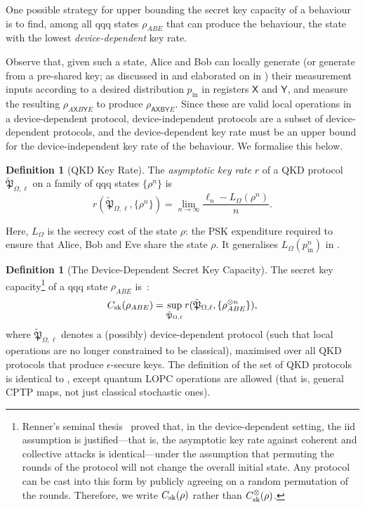 \documentclass[10pt, a4paper]{article}
\numberwithin{equation}{section} %
\newcounter{stmt} %
\theoremstyle{definition}
\newtheorem{defn}[stmt]{Definition}
\theoremstyle{plain}
\newcommand{\?}{\mathrel{?}} %
\newcommand{\crv}[1]{\mathsf{#1}}
\newcommand{\qproto}[2][\ell]{\tilde{\mathfrak{P}}_{#2, #1}}
\newcommand{\prin}[1][p]{#1_{\mathrm{in}}}
\newcommand{\sk}{\rm sk}
\begin{document}
    One possible strategy for upper bounding the secret key capacity of a behaviour is to find, among all qqq states \(\rho_{ABE}\) that can produce the behaviour, the state with the lowest \emph{device-dependent} key rate.

    Observe that, given such a state, Alice and Bob can locally generate (or generate from a pre-shared key; as discussed in  and elaborated on in ) their measurement inputs according to a desired distribution \(\prin\) in registers \(\crv{X}\) and \(\crv{Y}\), and measure the resulting \(\rho_{A\crv{X}B\crv{Y}E}\) to produce \(\rho_{\crv{AXBY}E}\). Since these are valid local operations in a device-dependent protocol, device-independent protocols are a subset of device-dependent protocols, and the device-dependent key rate must be an upper bound for the device-independent key rate of the behaviour. We formalise this below.

    \begin{defn}[QKD Key Rate]
      The \emph{asymptotic key rate} \(r\) of a QKD protocol \(\qproto{\Omega}\) on a family of qqq states \({\{\rho^{n}\}}\) is
      \begin{equation}
        r(\qproto{\Omega}, \{\rho^n\}) = \lim_{n\to\infty} \frac{\ell_n - L_{\Omega}(\rho^n)}{n}.
      \end{equation}
    \end{defn}
    Here, \(L_{\Omega}\) is the secrecy cost of the state \(\rho\): the PSK expenditure required to ensure that Alice, Bob and Eve share the state \(\rho\). It generalises \(L_{\Omega}(\prin^n)\) in .

    \begin{defn}[The Device-Dependent Secret Key Capacity]\label{def:seckeycapstate}
      The secret key capacity\footnote{Renner's seminal thesis~\cite{RennerQKD} proved that, in the device-dependent setting, the iid assumption is justified---that is, the asymptotic key rate against coherent and collective attacks is identical---under the assumption that permuting the rounds of the protocol will not change the overall initial state. Any protocol can be cast into this form by publicly agreeing on a random permutation of the rounds. Therefore, we write \(C_{\sk}(\rho)\) rather than \(C^{\otimes}_{\sk}(\rho)\).} of a qqq state \(\rho_{ABE}\) is~\cite{CQKeyDistill}:
      \begin{equation}
        C_{\sk}(\rho_{A B E}) = \sup_{\qproto{\Omega}} r(\qproto{\Omega}, \{\rho_{ABE}^{\otimes n}\}),
      \end{equation}
      where \(\qproto{\Omega}\) denotes a (possibly) device-dependent protocol (such that local operations are no longer constrained to be classical), maximised over all QKD protocols that produce \(\epsilon\)-secure keys. The definition of the set of QKD protocols is identical to , except quantum LOPC operations are allowed (that is, general CPTP maps, not just classical stochastic ones).
    \end{defn}
\end{document}
